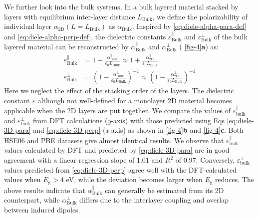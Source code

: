 We further look into the bulk systems. In a bulk layered material stacked by layers with equilibrium
inter-layer distance $L_{\mathrm{Bulk}}$, we define the polarizability
of individual layer $\alpha_{\mathrm{2D}}(L=L_{\mathrm{Bulk}})$ as
$\alpha_{\mathrm{Bulk}}$. Inspired by  \autoref{eq:diele-alpha-para-def} and
\autoref{eq:diele-alpha-perp-def}, the dielectric constants
$\varepsilon^{\parallel}_{\mathrm{Bulk}}$ and
$\varepsilon^{\perp}_{\mathrm{Bulk}}$ of the bulk layered material can
be reconstructed by $\alpha_{\mathrm{Bulk}}^{\parallel}$ and
$\alpha_{\mathrm{Bulk}}^{\perp}$ ( \autoref{fig-4}{\textbf a}) as:
%
%
\begin{subequations}
\begin{align}
  \label{eq:diele-3D-para}
  \varepsilon^{\parallel}_{\mathrm{Bulk}}
  &= 1 + \frac{\alpha_{\mathrm{Bulk}}^{\parallel}}{\varepsilon_{0} L_{\mathrm{Bulk}}}
  \approx 1 + \frac{\alpha_{\mathrm{2D}}^{\parallel}}{\varepsilon_{0} L_{\mathrm{Bulk}}} \\
  \label{eq:diele-3D-perp}
  \varepsilon^{\perp}_{\mathrm{Bulk}}
  &= \left(1 - \frac{\alpha_{\mathrm{Bulk}}^{\perp}}{\varepsilon_{0} L_{\mathrm{Bulk}}}\right)^{-1}
  \approx \left(1 - \frac{\alpha_{\mathrm{2D}}^{\perp}}{\varepsilon_{0} L_{\mathrm{Bulk}}}\right)^{-1}
\end{align}
\end{subequations}
%
%
Here we neglect the effect of the stacking order of the layers.  The
dielectric constant $\varepsilon$ although not well-defined for a
monolayer 2D material becomes applicable when the 2D layers are put
together.
%
We compare the values of
$\varepsilon_{\mathrm{bulk}}^{\parallel}$ and
$\varepsilon_{\mathrm{bulk}}^{\perp}$ from DFT calculations (\textit{y}-axis)
with those predicted using Eqs \autoref{eq:diele-3D-para} and \autoref{eq:diele-3D-perp}
(\textit{x}-axis) as shown in  \autoref{fig-4}{\textbf b} and \autoref{fig-4}{\textbf c}. 
Both HSE06 and PBE datasets give almost identical results.  
%
We observe that
$\varepsilon_{\mathrm{bulk}}^{\parallel}$ values calculated by DFT and
predicted by  \autoref{eq:diele-3D-para} are in good agreement with a linear
regression slope of 1.01 and $R^2$ of 0.97. Conversely,
$\varepsilon_{\mathrm{bulk}}^{\perp}$ values predicted from
 \autoref{eq:diele-3D-perp} agree well with the DFT-calculated values when
$E_{\mathrm{g}}>4$ eV, while the deviation becomes larger when
$E_{\mathrm{g}}$ reduces. The above results indicate that
$\alpha^{\parallel}_{\mathrm{Bulk}}$ can generally be estimated from
its 2D counterpart, while $\alpha^{\perp}_{\mathrm{Bulk}}$ differs due
to the interlayer coupling and overlap between induced
dipoles\cite{Andersen_2015_dielec_vdWH,Laturia_2018_2D_eps}. 

